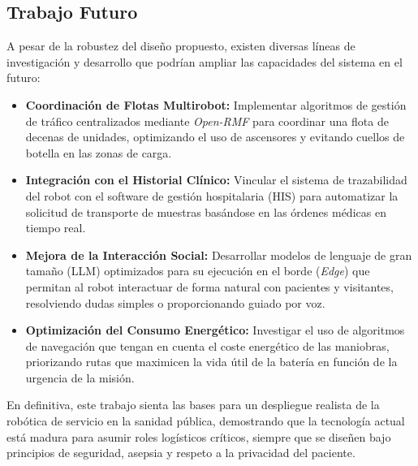 \subsection{Trabajo Futuro}
A pesar de la robustez del diseño propuesto, existen diversas líneas de investigación y desarrollo que podrían ampliar las capacidades del sistema en el futuro:
\begin{itemize}
    \item \textbf{Coordinación de Flotas Multirobot:} Implementar algoritmos de gestión de tráfico centralizados mediante \textit{Open-RMF} para coordinar una flota de decenas de unidades, optimizando el uso de ascensores y evitando cuellos de botella en las zonas de carga.
    \item \textbf{Integración con el Historial Clínico:} Vincular el sistema de trazabilidad del robot con el software de gestión hospitalaria (HIS) para automatizar la solicitud de transporte de muestras basándose en las órdenes médicas en tiempo real.
    \item \textbf{Mejora de la Interacción Social:} Desarrollar modelos de lenguaje de gran tamaño (LLM) optimizados para su ejecución en el borde (\textit{Edge}) que permitan al robot interactuar de forma natural con pacientes y visitantes, resolviendo dudas simples o proporcionando guiado por voz.
    \item \textbf{Optimización del Consumo Energético:} Investigar el uso de algoritmos de navegación que tengan en cuenta el coste energético de las maniobras, priorizando rutas que maximicen la vida útil de la batería en función de la urgencia de la misión.
\end{itemize}

En definitiva, este trabajo sienta las bases para un despliegue realista de la robótica de servicio en la sanidad pública, demostrando que la tecnología actual está madura para asumir roles logísticos críticos, siempre que se diseñen bajo principios de seguridad, asepsia y respeto a la privacidad del paciente.
